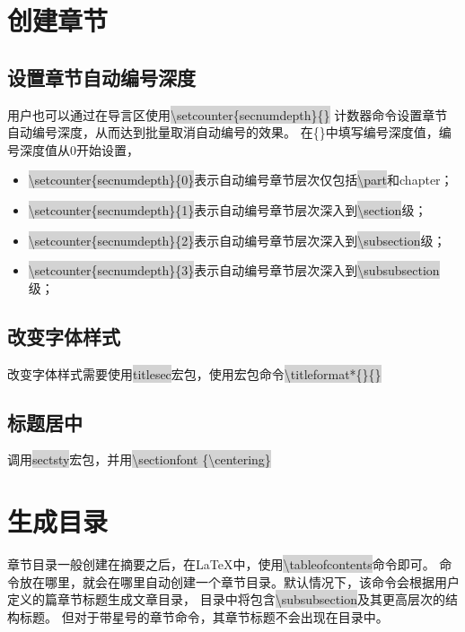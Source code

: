 \documentclass[a4paper,twoside,12pt]{article}
\begin{document}
\section{创建章节}

\subsection{设置章节自动编号深度}
用户也可以通过在导言区使用\colorbox{lightgray}{\textbackslash setcounter\{secnumdepth\}\{\}} 
计数器命令设置章节自动编号深度，从而达到批量取消自动编号的效果。
在\{\}中填写编号深度值，编号深度值从0开始设置，
\begin{itemize}
    \item \colorbox{lightgray}{\textbackslash setcounter\{secnumdepth\}\{0\}}表示自动编号章节层次仅包括\colorbox{lightgray}{\textbackslash part}和chapter；
    \item \colorbox{lightgray}{\textbackslash setcounter\{secnumdepth\}\{1\}}表示自动编号章节层次深入到\colorbox{lightgray}{\textbackslash section}级；
    \item \colorbox{lightgray}{\textbackslash setcounter\{secnumdepth\}\{2\}}表示自动编号章节层次深入到\colorbox{lightgray}{\textbackslash subsection}级；
    \item \colorbox{lightgray}{\textbackslash setcounter\{secnumdepth\}\{3\}}表示自动编号章节层次深入到\colorbox{lightgray}{\textbackslash subsubsection}级；
\end{itemize}
\subsection{改变字体样式}
改变字体样式需要使用\colorbox{lightgray}{titlesec}宏包，使用宏包命令\colorbox{lightgray}{\textbackslash titleformat*\{\}\{\}}
\subsection{标题居中}
调用\colorbox{lightgray}{sectsty}宏包，并用\colorbox{lightgray}{\textbackslash sectionfont \{\textbackslash centering\}}

\section{生成目录}
章节目录一般创建在摘要之后，在\LaTeX 中，使用\colorbox{lightgray}{\textbackslash tableofcontents}命令即可。
命令放在哪里，就会在哪里自动创建一个章节目录。默认情况下，该命令会根据用户定义的篇章节标题生成文章目录，
目录中将包含\colorbox{lightgray}{\textbackslash subsubsection}及其更高层次的结构标题。
但对于带星号的章节命令，其章节标题不会出现在目录中。
\end{document}
